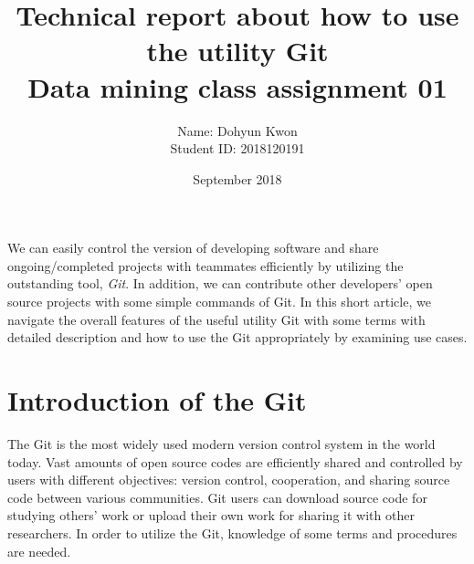 \documentclass{article}
\title{Technical report about how to use the utility Git \\ Data mining class assignment 01}
\author{Name: Dohyun Kwon \\ Student ID: 2018120191}
\date{September 2018}
\begin{document}
\maketitle

We can easily control the version of developing software and share ongoing/completed projects with teammates efficiently by utilizing the outstanding tool, \textit{Git}. In addition, we can contribute other developers' open source projects with some simple commands of Git. In this short article, we navigate the overall features of the useful utility Git with some terms with detailed description and how to use the Git appropriately by examining use cases. 

\section{Introduction of the Git}
The Git is the most widely used modern version control system in the world today. Vast amounts of open source codes are efficiently shared and controlled by users with different objectives: version control, cooperation, and sharing source code between various communities. Git users can download source code for studying others' work or upload their own work for sharing it with other researchers. In order to utilize the Git, knowledge of some terms and procedures are needed.  
\end{document}
